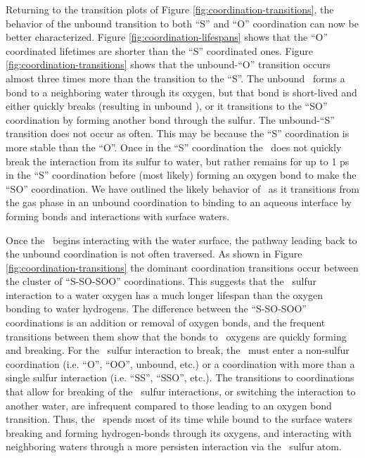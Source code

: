 Returning to the transition plots of Figure \ref{fig:coordination-transitions}, the behavior of the unbound transition to both ``S'' and ``O'' coordination can now be better characterized. Figure \ref{fig:coordination-lifespans} shows that the ``O'' coordinated lifetimes are shorter than the ``S'' coordinated ones. Figure \ref{fig:coordination-transitions} shows that the unbound-``O'' transition occurs almost three times more than the transition to the ``S''. The unbound \suldiox~forms a bond to a neighboring water through its oxygen, but that bond is short-lived and either quickly breaks (resulting in unbound \suldiox), or it transitions to the ``SO'' coordination by forming another bond through the sulfur. The unbound-``S'' transition does not occur as often. This may be because the ``S'' coordination is more stable than the ``O''. Once in the ``S'' coordination the \suldiox~does not quickly break the interaction from its sulfur to water, but rather remains for up to 1 ps in the ``S'' coordination before (most likely) forming an oxygen bond to make the ``SO'' coordination. We have outlined the likely behavior of \suldiox~as it transitions from the gas phase in an unbound coordination to binding to an aqueous interface by forming bonds and interactions with surface waters.

Once the \suldiox~begins interacting with the water surface, the pathway leading back to the unbound coordination is not often traversed. As shown in Figure \ref{fig:coordination-transitions} the dominant coordination transitions occur between the cluster of ``S-SO-SOO'' coordinations. This suggests that the \suldiox~sulfur interaction to a water oxygen has a much longer lifespan than the oxygen bonding to water hydrogens. The difference between the ``S-SO-SOO'' coordinations is an addition or removal of oxygen bonds, and the frequent transitions between them show that the bonds to \suldiox~oxygens are quickly forming and breaking. For the \suldiox~sulfur interaction to break, the \suldiox~must enter a non-sulfur coordination (i.e. ``O'', ``OO'', unbound, etc.) or a coordination with more than a single sulfur interaction (i.e. ``SS'', ``SSO'', etc.). The transitions to coordinations that allow for breaking of the \suldiox~sulfur interactions, or switching the interaction to another water, are infrequent compared to those leading to an oxygen bond transition. Thus, the \suldiox~spends most of its time while bound to the surface waters breaking and forming hydrogen-bonds through its oxygens, and interacting with neighboring waters through a more persisten interaction via the \suldiox~sulfur atom.
